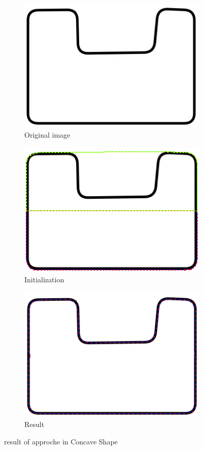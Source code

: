 \begin{figure}[H]
    \centering
    \begin{subfigure}[b]{1\textwidth}
        \centering
        \includegraphics[width=12cm,height=6.5cm]{chapiter3/figures/Figure 11 a.jpg}
        \caption{Original image}
    \end{subfigure}
    \hfill
    \begin{subfigure}[b]{1\textwidth}
        \centering
        \includegraphics[width=12cm,height=6.5cm]{chapiter3/figures/figure 11 b.png}
        \caption{Initialization}
    \end{subfigure}
    \hfill
    \begin{subfigure}[b]{1\textwidth}
        \centering
        \includegraphics[width=12cm,height=6.5cm]{chapiter3/figures/figure 09.png}
        \caption{Result}
    \end{subfigure}
    \caption{result of approche in Concave Shape}
    \label{fig:figure3.10}
\end{figure}

